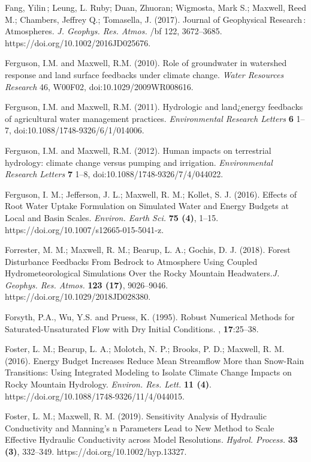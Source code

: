 \begin{thebibliography}{999}
Fang, Yilin ; Leung, L. Ruby; Duan, Zhuoran; Wigmosta, Mark S.; Maxwell, Reed M.; Chambers, Jeffrey Q.; Tomasella, J. (2017). Journal of Geophysical Research : Atmospheres. {\em J. Geophys. Res. Atmos.} {/bf 122}, 3672–3685. https://doi.org/10.1002/2016JD025676.

Ferguson, I.M. and Maxwell, R.M. (2010). Role of groundwater in watershed response and land surface feedbacks under climate change. {\em Water Resources Research} 46, W00F02, doi:10.1029/2009WR008616.

Ferguson, I.M. and Maxwell, R.M. (2011). Hydrologic and land¿energy feedbacks of agricultural water management practices. {\em Environmental Research Letters} {\bf 6} 1--7, doi:10.1088/1748-9326/6/1/014006.

Ferguson, I.M. and Maxwell, R.M. (2012). Human impacts on terrestrial hydrology: climate change versus pumping and irrigation. {\em Environmental Research Letters} {\bf 7} 1--8, doi:10.1088/1748-9326/7/4/044022.

Ferguson, I. M.; Jefferson, J. L.; Maxwell, R. M.; Kollet, S. J. (2016). Effects of Root Water Uptake Formulation on Simulated Water and Energy Budgets at Local and Basin Scales. {\em Environ. Earth Sci.} {\bf 75 (4)}, 1–15. https://doi.org/10.1007/s12665-015-5041-z.

Forrester, M. M.; Maxwell, R. M.; Bearup, L. A.; Gochis, D. J. (2018). Forest Disturbance Feedbacks From Bedrock to Atmosphere Using Coupled Hydrometeorological Simulations Over the Rocky Mountain Headwaters.{\em J. Geophys. Res. Atmos.} {\bf 123 (17)}, 9026–9046. https://doi.org/10.1029/2018JD028380.

Forsyth, P.A., Wu, Y.S. and Pruess, K. (1995).
\newblock Robust Numerical Methods for Saturated-Unsaturated Flow with Dry Initial Conditions.
, {\bf 17}:25--38.

Foster, L. M.; Bearup, L. A.; Molotch, N. P.; Brooks, P. D.; Maxwell, R. M. (2016). Energy Budget Increases Reduce Mean Streamflow More than Snow-Rain Transitions: Using Integrated Modeling to Isolate Climate Change Impacts on Rocky Mountain Hydrology. {\em Environ. Res. Lett.} {\bf 11 (4)}. https://doi.org/10.1088/1748-9326/11/4/044015.


Foster, L. M.; Maxwell, R. M. (2019). Sensitivity Analysis of Hydraulic Conductivity and Manning’s n Parameters Lead to New Method to Scale Effective Hydraulic Conductivity across Model Resolutions. {\em Hydrol. Process.} {\bf 33 (3)}, 332–349. https://doi.org/10.1002/hyp.13327.



\end{thebibliography}
